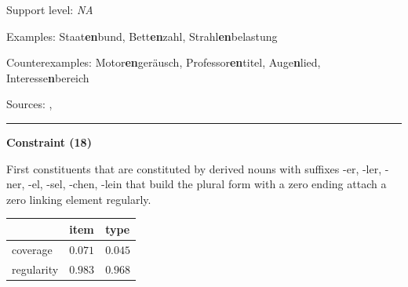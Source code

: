 \vspace{-1.35em}

\noindent
Support level: \textit{NA}

\vspace{0.3em}

\noindent
Examples: Staat\textbf{en}bund, Bett\textbf{en}zahl, Strahl\textbf{en}belastung

\noindent
Counterexamples: Motor\textbf{en}geräusch, Professor\textbf{en}titel, Auge\textbf{n}lied, Interesse\textbf{n}bereich

\vspace{0.3em}

\noindent
Sources: \citet[80]{nuebling_szczepaniak_2013}, \citet[92]{ortner_mueller-bollhagen_1991}

\vspace{0.35em}
\hrule




\vspace{0.4em}

\begin{center}
\textbf{Constraint (18)}
\end{center}

\noindent
First constituents that are constituted by derived nouns with suffixes -er, -ler, -ner, -el, -sel, -chen, -lein that build the plural form with a zero ending attach a zero linking element regularly.
\vspace{0.5em}


\vspace{-0.25em}

\begin{table}[!ht]
\begin{center}
\setlength{\extrarowheight}{1pt}
\begin{tabularx}{\columnwidth}{|X|X|X|}
\hline
 & item & type \\
\hline
 coverage & $0.071$ & $0.045$ \\
\hline
 regularity & $0.983$ & $0.968$ \\
\hline
\end{tabularx}
\end{center}
\end{table}

